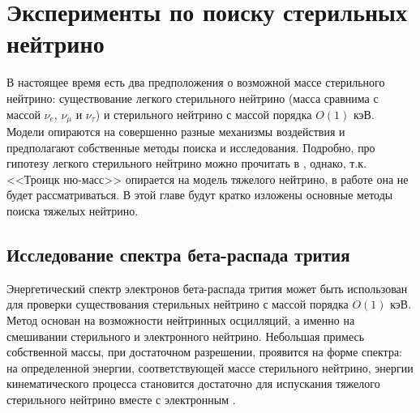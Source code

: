 \documentclass[a4paper,14pt]{extreport}
\begin{document}
\chapter{Эксперименты по поиску стерильных нейтрино}
В настоящее время есть два предположения о возможной массе стерильного нейтрино: существование легкого стерильного нейтрино (масса сравнима с массой $ \nu_{e} $, $ \nu_{\mu} $ и $ \nu_{\tau} $) и стерильного нейтрино с массой порядка $O(1)$ кэВ. Модели опираются на совершенно разные механизмы воздействия и предполагают собственные методы поиска и исследования. Подробно, про гипотезу легкого стерильного нейтрино можно прочитать в \cite{light-sterile-neutrino-whitepaper}, однако, т.к. <<Троицк ню-масс>> опирается на модель тяжелого нейтрино, в работе она не будет рассматриваться. В этой главе будут кратко изложены основные методы поиска тяжелых нейтрино.
\section{Исследование спектра бета-распада трития}
Энергетический спектр электронов бета-распада трития может быть использован для проверки существования стерильных нейтрино с массой порядка $O(1)$ кэВ. Метод основан на возможности нейтринных осцилляций, а именно на смешивании стерильного и электронного нейтрино. Небольшая примесь собственной массы, при достаточном разрешении, проявится на форме спектра: на определенной энергии, соответствующей массе стерильного нейтрино, энергии кинематического процесса становится достаточно для испускания тяжелого стерильного нейтрино вместе с электронным \cite{new-tests-for-and-bounds-on-neutrino-masses-and-lepton-mixing}\cite{role-of-sterile-neutrino-warm-dark-matter-in-rhenium-and-tritium-beta-decays}\cite{signatures-of-extra-dimensional-sterile-neutrinos}\cite{sterile-neutrinos-and-right-handed-currents-in-katrin}.
\end{document}
